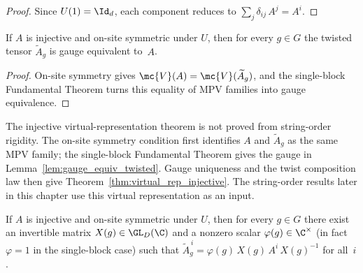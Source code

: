 \begin{proof}\leanok{}
    Since $U(1) = \Id_d$, each component reduces to
    $\sum_j \delta_{ij}\, A^j = A^i$.
\end{proof}

\begin{lemma}%
    \label{lem:gauge_equiv_twisted}
    \leanok
    If $A$ is injective and on-site symmetric under $U$, then
    for every $g \in G$ the twisted tensor $\widetilde{A}_g$ is
    gauge equivalent to~$A$.
\end{lemma}

\begin{proof}\leanok{}
    On-site symmetry gives
    $\mc{V}(A) = \mc{V}(\widetilde{A}_g)$, and the single-block
    Fundamental Theorem turns this equality of MPV families into gauge
    equivalence.
\end{proof}

\begin{remark}%
    \label{rem:injective_symmetry_ft_route}
    The injective virtual-representation theorem is not proved from string-order
    rigidity. The on-site symmetry condition first identifies $A$ and
    $\widetilde{A}_g$ as the same MPV family; the single-block Fundamental
    Theorem gives the gauge in Lemma~\ref{lem:gauge_equiv_twisted}. Gauge
    uniqueness and the twist composition law then give
    Theorem~\ref{thm:virtual_rep_injective}. The string-order results later in
    this chapter use this virtual representation as an input.
\end{remark}

\begin{theorem}\label{thm:virtual_symmetry_eq}
    \leanok
    If $A$ is injective and on-site symmetric under $U$, then
    for every $g \in G$ there exist an invertible matrix $X(g) \in \GL_{D}(\C)$
    and a nonzero scalar $\varphi(g) \in \C^{\times}$ (in fact $\varphi = 1$
    in the single-block case) such that
    $\widetilde{A}_g^{\,i} = \varphi(g)\, X(g)\, A^i\, X(g)^{-1}$ for all~$i$.
\end{theorem}

